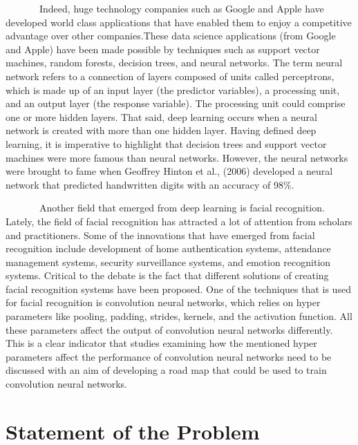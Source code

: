 \documentclass[
  12pt,
]{report}
\begin{document}
~~~~~~~Indeed, huge technology companies such as Google and Apple have
developed world class applications that have enabled them to enjoy a
competitive advantage over other companies.These data science
applications (from Google and Apple) have been made possible by
techniques such as support vector machines, random forests, decision
trees, and neural networks. The term neural network refers to a
connection of layers composed of units called perceptrons, which is made
up of an input layer (the predictor variables), a processing unit, and
an output layer (the response variable). The processing unit could
comprise one or more hidden layers. That said, deep learning occurs when
a neural network is created with more than one hidden layer. Having
defined deep learning, it is imperative to highlight that decision trees
and support vector machines were more famous than neural networks.
However, the neural networks were brought to fame when Geoffrey Hinton
et al., (2006) developed a neural network that predicted handwritten
digits with an accuracy of 98\%.

~~~~~~~Another field that emerged from deep learning is facial
recognition. Lately, the field of facial recognition has attracted a lot
of attention from scholars and practitioners. Some of the innovations
that have emerged from facial recognition include development of home
authentication systems, attendance management systems, security
surveillance systems, and emotion recognition systems. Critical to the
debate is the fact that different solutions of creating facial
recognition systems have been proposed. One of the techniques that is
used for facial recognition is convolution neural networks, which relies
on hyper parameters like pooling, padding, strides, kernels, and the
activation function. All these parameters affect the output of
convolution neural networks differently. This is a clear indicator that
studies examining how the mentioned hyper parameters affect the
performance of convolution neural networks need to be discussed with an
aim of developing a road map that could be used to train convolution
neural networks.

\section{Statement of the Problem}\label{statement-of-the-problem}
\end{document}
